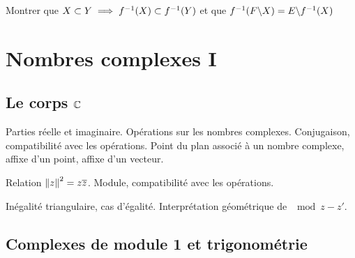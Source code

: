 \documentclass[a4paper,french,bookmarks]{book}
\begin{document}
\begin{enumerate}
        Montrer que $X \subset Y \implies f^{-1}\!\left(X\right) \subset f^{-1}\!\left(Y\right)$ et que $f^{-1}\!\left(F \backslash X\right) = E \backslash f^{-1}\!\left(X\right)$
        
    \end{enumerate}
    
    \cleardoublepage
    \def\khdate{du 4 au 8 octobre 2021}
    \chapter{Nombres complexes I}
    
    \section*{Le corps $\mathbb{C}$}
    
    \begin{enumerate}
        \ithand Parties réelle et imaginaire. Opérations sur les nombres complexes. Conjugaison, compatibilité avec les opérations. Point du plan associé à un nombre complexe, affixe d'un point, affixe d'un vecteur.
        
        \ithand Relation $\left\lVert z\right\rVert^2 = z\overline{z}$. Module, compatibilité avec les opérations.
        
        \ithand Inégalité triangulaire, cas d'égalité. Interprétation géométrique de $\mod{z - z'}$.
    \end{enumerate}
    
    \section*{Complexes de module 1 et trigonométrie}
    
\end{document}

